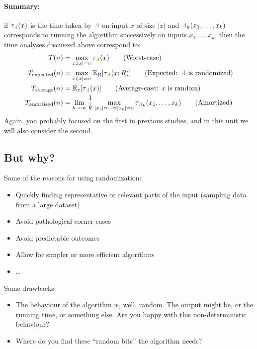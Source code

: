 \paragraph{Summary:} if $\tau_{\Algo}(x)$ is the time taken by $\Algo$ on input $x$ of size
$|x|$ and $\Algo_k(x_1,\dots,x_k)$ corresponds to running the algorithm successively on
inputs $x_1, \dots, x_k$, then the time analyses discussed above correspond to:
\begin{align*}
    T(\ns) &= \max_{x: |x|=\ns} \tau_{\Algo}(x) \tag{Worst-case} \\
    T_{\rm{}expected}(\ns) &= \max_{x: |x|=\ns} \bE{R}{\tau_{\Algo}(x;R)} \tag{Expected: $\Algo$ is randomized} \\
    T_{\rm{}average}(\ns) &= \bE{x}{\tau_{\Algo}(x)} \tag{Average-case: $x$ is random} \\
    T_{\rm{}amortized}(\ns) &= \lim_{k\to\infty} \frac{1}{k}\max_{|x_1|=\dots=|x_k|=\ns} \tau_{\Algo_k}(x_1,\dots,x_k) \tag{Amortized}
\end{align*}
Again, you probably focused on the first in previous studies, and in this unit we will also consider the second.

\subsection{But why?}
\noindent Some of the reasons for using randomization:
\begin{itemize}
    \item Quickly finding representative or relevant parts of the input (\eg sampling data from a large dataset)
    \item Avoid pathological corner cases
    \item Avoid predictable outcomes %
    \item Allow for simpler or more efficient algorithms
    \item \dots{}
\end{itemize}
Some drawbacks:
\begin{itemize}
    \item The behaviour of the algorithm is, well, random. The output might be, or the running time, or something else. Are you happy with this non-deterministic behaviour?
    \item Where do you find these ``random bits'' the algorithm needs?
\end{itemize}
